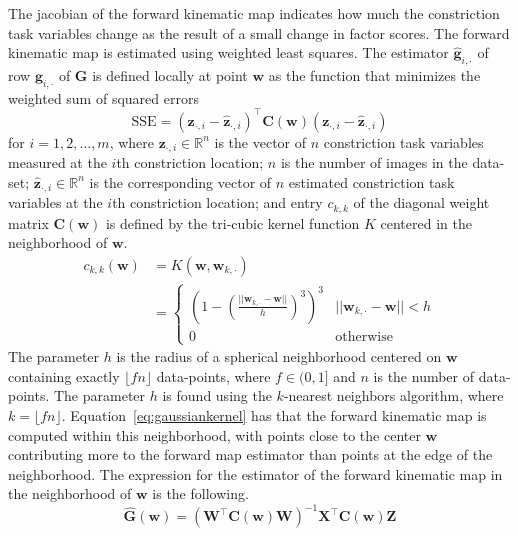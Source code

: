 \documentclass[preprint]{JASAnew}\usepackage[]{graphicx}\usepackage[]{color}
\begin{document}
%
The jacobian of the forward kinematic map indicates how much the constriction task variables change as the result of a small change in factor scores.
%
The forward kinematic map is estimated using weighted least squares. 
% 
The estimator $\mathbf{\hat{g}}_{i,\cdot}$ of row $\mathbf{g}_{i,\cdot}$ of $\mathbf{G}$ is defined locally at point $\mathbf{w}$ as the function that minimizes the weighted sum of squared errors
%
\begin{equation}
\mathrm{SSE} 
=
\left( \mathbf{z}_{\cdot,i} - \mathbf{\hat{z}}_{\cdot,i} \right)^\intercal
\mathbf{C}(\mathbf{w})
\left( \mathbf{z}_{\cdot,i} - \mathbf{\hat{z}}_{\cdot,i} \right)
\end{equation}
%
for $i=1,2,\ldots,m$,
% 
where $\mathbf{z}_{\cdot,i} \in \mathbb{R}^{n}$ is the vector of $n$ constriction task variables measured at the $i$th constriction location; 
%
$n$ is the number of images in the data-set; 
%
$\mathbf{\hat{z}}_{\cdot,i} \in \mathbb{R}^{n}$ is the corresponding vector of $n$ estimated constriction task variables at the $i$th constriction location; and 
%
entry $c_{k,k}$ of the diagonal weight matrix $\mathbf{C}(\mathbf{w})$ is defined by the tri-cubic kernel function $K$ centered in the neighborhood of $\mathbf{w}$.
%
\begin{align}\label{eq:gaussiankernel}
c_{k,k} (\mathbf{w})
&=
K(\mathbf{w},\mathbf{w}_{k,\cdot}) \\
&= 
\begin{cases}
\left( 1 - \left( \frac{\lvert\lvert \mathbf{w}_{k,\cdot} - \mathbf{w} \rvert\rvert}{h} \right)^3 \right)^3 & \lvert\lvert \mathbf{w}_{k,\cdot} - \mathbf{w} \rvert\rvert < h \\
0 & \text{otherwise}
\end{cases} 
\end{align}
%
The parameter $h$ is the radius of a spherical neighborhood centered on $\mathbf{w}$ containing exactly $\lfloor fn \rfloor$ data-points, where $f\in (0,1]$ and $n$ is the number of data-points. The parameter $h$ is found using the $k$-nearest neighbors algorithm, where $k = \lfloor fn \rfloor$. Equation~\ref{eq:gaussiankernel} has that the forward kinematic map is computed within this neighborhood, 
with points close to the center $\mathbf{w}$ contributing more to the forward map estimator than points at the edge of the neighborhood.
%
The expression for the estimator of the forward kinematic map in the neighborhood of $\mathbf{w}$ is the following. 
\begin{equation}
\label{eq:lsqestimator}
\mathbf{\hat{G}} (\mathbf{w})
=
\left( \mathbf{W}^\intercal \mathbf{C}(\mathbf{w}) \mathbf{W} \right)^{-1} \mathbf{X}^\intercal \mathbf{C}(\mathbf{w}) \mathbf{Z}
\end{equation}
\end{document}
